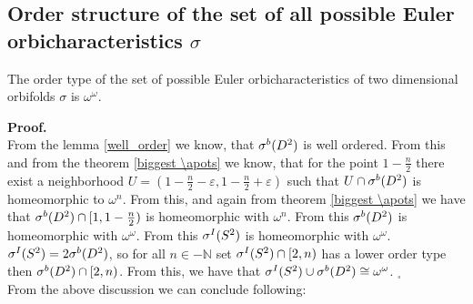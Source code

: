 \subsection{Order structure of the set of all possible Euler orbicharacteristics $\sigma$}
\begin{theorem}
The order type of the set of possible Euler orbicharacteristics of two dimensional orbifolds 
$\sigma$ is $\omega^\omega$. 
\end{theorem}
\noindent\textbf{Proof.} \\
From the lemma \ref{well_order} we know, that ${\mathcal{\sigma}^b(D^2)}$ is well ordered. From this and 
from the theorem \ref{biggest \apots} we know, that for the point $1-\frac{n}{2}$ there exist 
a neighborhood $U=(1-\frac{n}{2}-\varepsilon,1-\frac{n}{2}+\varepsilon)$ such that $U \cap 
{\mathcal{\sigma}^b(D^2)}$ is homeomorphic to $\omega^n$. From this, and again from theorem \ref{biggest \apots} 
we have that ${\mathcal{\sigma}^b(D^2)} \cap [1,1-\frac{n}{2})$ is homeomorphic with $\omega^n$. 
From this ${\mathcal{\sigma}^b(D^2)}$ is homeomorphic with $\omega^\omega$. From this ${\mathcal{\sigma}^I(S^2)}$ is homeomorphic 
with $\omega^\omega$. \\
${\mathcal{\sigma}^I(S^2)} = 2{\mathcal{\sigma}^b(D^2)}$, so for all $n\in -\mathbb{N}$ set ${\mathcal{\sigma}^I(S^2)} \cap [2,n)$ has a lower order type then 
${\mathcal{\sigma}^b(D^2)}\cap [2,n)$. From this, we have that ${\mathcal{\sigma}^I(S^2)} \cup {\mathcal{\sigma}^b(D^2)} \cong \omega^\omega$. $_\square$ \\[4pt]
From the above discussion we can conclude following:

